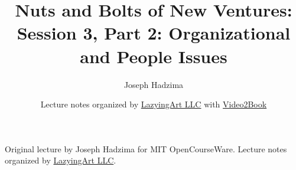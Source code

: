 \documentclass[11pt,oneside]{book}
\begin{document}
\frontmatter
\title{Nuts and Bolts of New Ventures: Session 3, Part 2: Organizational and People Issues}
\author{Joseph Hadzima}
\date{Lecture notes organized by \href{https://lazying.art}{LazyingArt LLC} with \href{https://github.com/lachlanchen/Video2Book}{Video2Book}}
\maketitle
\begin{center}
\small Original lecture by Joseph Hadzima for MIT OpenCourseWare. Lecture notes organized by \href{https://lazying.art}{LazyingArt LLC}.
\end{center}
\clearpage
\mainmatter

\end{document}
